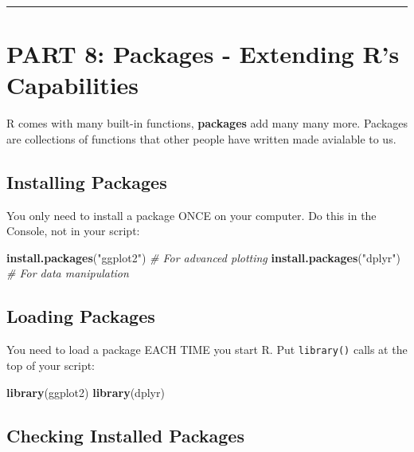 \documentclass[
]{article}
\newenvironment{Shaded}{\begin{snugshade}}{\end{snugshade}}
\newcommand{\CommentTok}[1]{\textcolor[rgb]{0.56,0.35,0.01}{\textit{#1}}}
\newcommand{\FunctionTok}[1]{\textcolor[rgb]{0.13,0.29,0.53}{\textbf{#1}}}
\newcommand{\NormalTok}[1]{#1}
\newcommand{\StringTok}[1]{\textcolor[rgb]{0.31,0.60,0.02}{#1}}
\begin{document}
\begin{center}\rule{0.5\linewidth}{0.5pt}\end{center}

\section{PART 8: Packages - Extending R's
Capabilities}\label{part-8-packages---extending-rs-capabilities}

R comes with many built-in functions, \textbf{packages} add many many
more. Packages are collections of functions that other people have
written made avialable to us.

\subsection{Installing Packages}\label{installing-packages}

You only need to install a package ONCE on your computer. Do this in the
Console, not in your script:

\begin{Shaded}
\begin{Highlighting}[]
\FunctionTok{install.packages}\NormalTok{(}\StringTok{"ggplot2"}\NormalTok{)  }\CommentTok{\# For advanced plotting}
\FunctionTok{install.packages}\NormalTok{(}\StringTok{"dplyr"}\NormalTok{)    }\CommentTok{\# For data manipulation}
\end{Highlighting}
\end{Shaded}

\subsection{Loading Packages}\label{loading-packages}

You need to load a package EACH TIME you start R. Put \texttt{library()}
calls at the top of your script:

\begin{Shaded}
\begin{Highlighting}[]
\FunctionTok{library}\NormalTok{(ggplot2)}
\FunctionTok{library}\NormalTok{(dplyr)}
\end{Highlighting}
\end{Shaded}

\subsection{Checking Installed
Packages}\label{checking-installed-packages}
\end{document}
